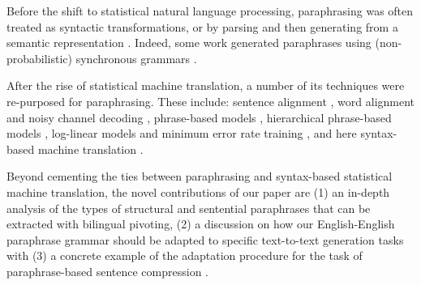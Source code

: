 \documentclass[11pt]{article}
\begin{document}
Before the shift to statistical natural language processing,
paraphrasing was often treated as syntactic transformations, or by
parsing and then generating from a semantic representation
\cite{mckeown:1979:ACL,Muraki1982,Meteer1988,Shemtov1996,Yamamoto2002}.
Indeed, some work generated paraphrases using (non-probabilistic)
synchronous grammars
\cite{Shieber1990,Dras1997,Dras1999,Kozlowski2003}.

After the rise of statistical machine translation, a number of its
techniques were re-purposed for paraphrasing.  These include: sentence
alignment \cite{Gale1993,Barzilay2003a}, word alignment and noisy
channel decoding \cite{Brown1990,Quirk2004}, phrase-based models
\cite{Koehn2003,Callison-Burch2005}, hierarchical phrase-based models
\cite{Chiang2005,Madnani2007}, log-linear models and minimum error
rate training \cite{Och2003c,Madnani2007,Zhao2008b}, and here
syntax-based machine translation
\cite{Wu1997,Yamada2001,Melamed2004,Quirk2005}.


Beyond cementing the ties between paraphrasing and syntax-based
statistical machine translation, the novel contributions of our paper
are (1) an in-depth analysis of the types of structural and sentential
paraphrases that can be extracted with bilingual pivoting, (2) a
discussion on how our English-English paraphrase grammar should be
adapted to specific text-to-text generation tasks
\cite{zhao-EtAl:2009:ACLIJCNLP2} with (3) a concrete example of the
adaptation procedure for the task of paraphrase-based sentence
compression \cite{KnightMarcuAI02,cohn-lapata:2008,Cohn2009}.





\end{document}
